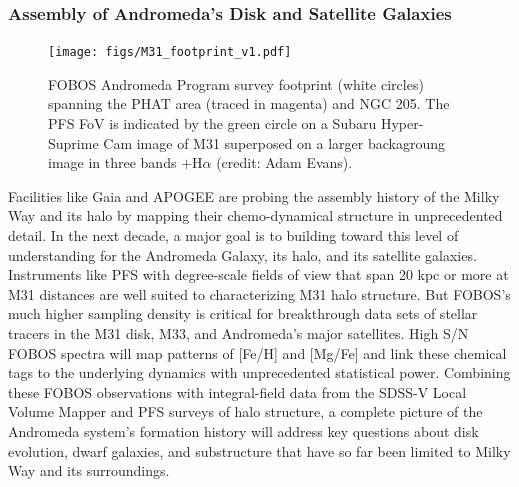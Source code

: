 \documentclass[oneside,11pt]{amsart}
\begin{document}
\subsubsection{Assembly of Andromeda's Disk and Satellite Galaxies}
\label{sec:localgroup}

\begin{figure}\small
%
\texttt{[image: figs/M31\_footprint\_v1.pdf]}
%
\caption{FOBOS Andromeda Program survey footprint (white circles) spanning the PHAT area (traced in magenta) and NGC 205.  The PFS FoV is indicated by the green circle on a Subaru Hyper-Suprime Cam image of M31 superposed on a larger backagroung image in three bands $+$H$\alpha$ (credit: Adam Evans).  }
%
\label{fig:M31}
%
\end{figure}

Facilities like Gaia and APOGEE are probing the assembly history of the Milky Way and its halo by mapping their
chemo-dynamical structure in unprecedented detail.  In the next decade, a major goal is to building toward this level
of understanding for the Andromeda Galaxy, its halo, and its satellite galaxies.  Instruments like PFS with
degree-scale fields of view that span 20 kpc or more at M31 distances are well suited to characterizing M31 halo
structure.  But FOBOS's much higher sampling density is critical for breakthrough data sets of stellar tracers in the
M31 disk, M33, and Andromeda's major satellites.  High S/N FOBOS spectra will map patterns of [Fe/H] and [Mg/Fe] and
link these chemical tags to the underlying dynamics with unprecedented statistical power.  Combining these FOBOS
observations with integral-field data from the SDSS-V Local Volume Mapper and PFS surveys of halo structure, a complete
picture of the Andromeda system's formation history will address key questions about disk evolution, dwarf galaxies,
and substructure that have so far been limited to Milky Way and its surroundings.
\end{document}
